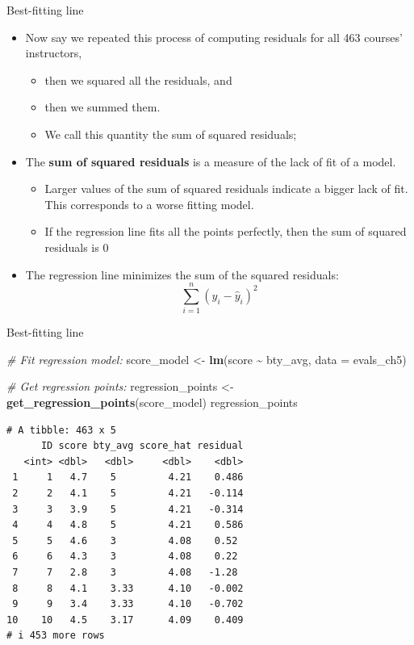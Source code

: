 \documentclass[
  ignorenonframetext,
]{beamer}
\newenvironment{Shaded}{\begin{snugshade}}{\end{snugshade}}
\newcommand{\AttributeTok}[1]{\textcolor[rgb]{0.13,0.29,0.53}{#1}}
\newcommand{\CommentTok}[1]{\textcolor[rgb]{0.56,0.35,0.01}{\textit{#1}}}
\newcommand{\FunctionTok}[1]{\textcolor[rgb]{0.13,0.29,0.53}{\textbf{#1}}}
\newcommand{\NormalTok}[1]{#1}
\newcommand{\OtherTok}[1]{\textcolor[rgb]{0.56,0.35,0.01}{#1}}
\newcommand{\SpecialCharTok}[1]{\textcolor[rgb]{0.81,0.36,0.00}{\textbf{#1}}}
\providecommand{\tightlist}{%
  \setlength{\itemsep}{0pt}\setlength{\parskip}{0pt}}
\begin{document}
\begin{frame}{Best-fitting line}
\protect\hypertarget{best-fitting-line-1}{}
\begin{itemize}
\item
  Now say we repeated this process of computing residuals for all 463
  courses' instructors,

  \begin{itemize}
  \tightlist
  \item
    then we squared all the residuals, and
  \item
    then we summed them.
  \item
    We call this quantity the sum of squared residuals;
  \end{itemize}
\item
  The \textbf{sum of squared residuals} is a measure of the lack of fit
  of a model.

  \begin{itemize}
  \tightlist
  \item
    Larger values of the sum of squared residuals indicate a bigger lack
    of fit. This corresponds to a worse fitting model.
  \item
    If the regression line fits all the points perfectly, then the sum
    of squared residuals is 0
  \end{itemize}
\item
  The regression line minimizes the sum of the squared residuals:
  \[\sum_{i=1}^n(y_i-\hat{y}_i)^2\]
\end{itemize}
\end{frame}

\begin{frame}[fragile]{Best-fitting line}
\protect\hypertarget{best-fitting-line-2}{}
\tiny

\begin{Shaded}
\begin{Highlighting}[]
\CommentTok{\# Fit regression model:}
\NormalTok{score\_model }\OtherTok{\textless{}{-}} \FunctionTok{lm}\NormalTok{(score }\SpecialCharTok{\textasciitilde{}}\NormalTok{ bty\_avg, }
                  \AttributeTok{data =}\NormalTok{ evals\_ch5)}

\CommentTok{\# Get regression points:}
\NormalTok{regression\_points }\OtherTok{\textless{}{-}} \FunctionTok{get\_regression\_points}\NormalTok{(score\_model)}
\NormalTok{regression\_points}
\end{Highlighting}
\end{Shaded}

\begin{verbatim}
# A tibble: 463 x 5
      ID score bty_avg score_hat residual
   <int> <dbl>   <dbl>     <dbl>    <dbl>
 1     1   4.7    5         4.21    0.486
 2     2   4.1    5         4.21   -0.114
 3     3   3.9    5         4.21   -0.314
 4     4   4.8    5         4.21    0.586
 5     5   4.6    3         4.08    0.52 
 6     6   4.3    3         4.08    0.22 
 7     7   2.8    3         4.08   -1.28 
 8     8   4.1    3.33      4.10   -0.002
 9     9   3.4    3.33      4.10   -0.702
10    10   4.5    3.17      4.09    0.409
# i 453 more rows
\end{verbatim}

\normalsize
\end{frame}
\end{document}
